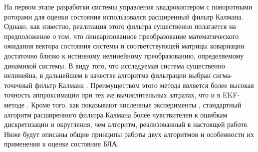 На первом этапе разработки системы управления квадрокоптером с поворотными роторами для оценки состояния использовался расширенный фильтр Калмана. Однако, как известно, реализация этого фильтра существенно полагается на предположение о том, что линеаризованное преобразование математического ожидания вектора состояния системы и соответствующей матрицы ковариации достаточно близко к истинному нелинейному преобразованию, определяемому динамикой системы. В виду того, что исследуемая система существенно нелинейна, в дальнейшем в качестве алгоритма фильтрации выбран сигма-точечный фильтр Калмана \cite{Julier01, Julier02}. Преимуществом этого метода является более высокая точность аппроксимации при тех же вычислительных затратах, что и в EKF-методе \cite{Kulikova01}. Кроме того, как показывают численные эксперименты \cite{Shavin01}, стандартный алгоритм расширенного фильтра Калмана более чувствителен к ошибкам дискретизации и округления, чем алгоритм, реализованный в настоящей работе. Ниже будут описаны общие принципы работы двух алгоритмов и особенности их применения к оценке состояния БЛА.

